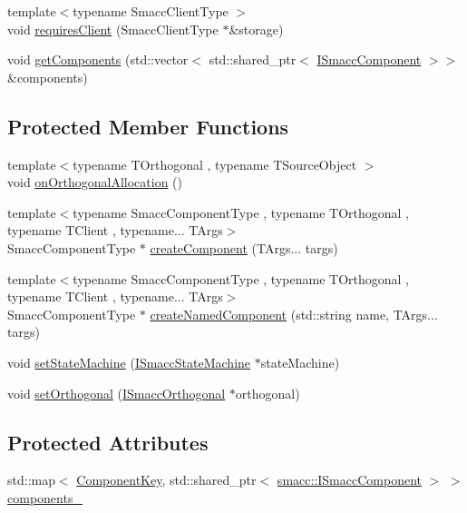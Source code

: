\begin{DoxyCompactItemize}
\item 
{\footnotesize template$<$typename Smacc\+Client\+Type $>$ }\\void \hyperlink{classsmacc_1_1ISmaccClient_a7a9990a2f3e35d547671188d69fee520}{requires\+Client} (Smacc\+Client\+Type $\ast$\&storage)
\item 
void \hyperlink{classsmacc_1_1ISmaccClient_ac6db21c1ec7072178e9f7c721908e07d}{get\+Components} (std\+::vector$<$ std\+::shared\+\_\+ptr$<$ \hyperlink{classsmacc_1_1ISmaccComponent}{I\+Smacc\+Component} $>$$>$ \&components)
\end{DoxyCompactItemize}
\subsection*{Protected Member Functions}
\begin{DoxyCompactItemize}
\item 
{\footnotesize template$<$typename T\+Orthogonal , typename T\+Source\+Object $>$ }\\void \hyperlink{classsmacc_1_1ISmaccClient_a5f5362f65ad0cc0506cfd201491acefb}{on\+Orthogonal\+Allocation} ()
\item 
{\footnotesize template$<$typename Smacc\+Component\+Type , typename T\+Orthogonal , typename T\+Client , typename... T\+Args$>$ }\\Smacc\+Component\+Type $\ast$ \hyperlink{classsmacc_1_1ISmaccClient_a5c1c8eb5e91a3b399662a52cb0ca86aa}{create\+Component} (T\+Args... targs)
\item 
{\footnotesize template$<$typename Smacc\+Component\+Type , typename T\+Orthogonal , typename T\+Client , typename... T\+Args$>$ }\\Smacc\+Component\+Type $\ast$ \hyperlink{classsmacc_1_1ISmaccClient_affcc2f95bc993b5f07ef0d6ab6eec8f1}{create\+Named\+Component} (std\+::string name, T\+Args... targs)
\item 
void \hyperlink{classsmacc_1_1ISmaccClient_a28fd6ca2bcf9c5e57f3cc16fb0a076d3}{set\+State\+Machine} (\hyperlink{classsmacc_1_1ISmaccStateMachine}{I\+Smacc\+State\+Machine} $\ast$state\+Machine)
\item 
void \hyperlink{classsmacc_1_1ISmaccClient_a40330788a976dc08e2f726d210564ec4}{set\+Orthogonal} (\hyperlink{classsmacc_1_1ISmaccOrthogonal}{I\+Smacc\+Orthogonal} $\ast$orthogonal)
\end{DoxyCompactItemize}
\subsection*{Protected Attributes}
\begin{DoxyCompactItemize}
\item 
std\+::map$<$ \hyperlink{structsmacc_1_1ComponentKey}{Component\+Key}, std\+::shared\+\_\+ptr$<$ \hyperlink{classsmacc_1_1ISmaccComponent}{smacc\+::\+I\+Smacc\+Component} $>$ $>$ \hyperlink{classsmacc_1_1ISmaccClient_a9e670e9071bb549dbeb08985d0114afe}{components\+\_\+}
\end{DoxyCompactItemize}
